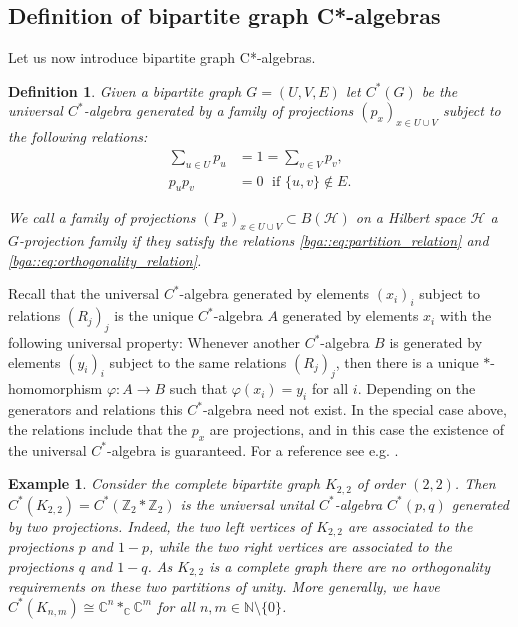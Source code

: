 \documentclass[a4paper]{amsart}
\newtheorem{definition}[thm]{Definition}
\newtheorem{example}[thm]{Example}
\newcommand{\C}{\mathbb{C}}
\newcommand{\N}{\mathbb{N}}
\newcommand{\Z}{\mathbb{Z}}
\begin{document}
\subsection{Definition of bipartite graph C*-algebras}

Let us now introduce bipartite graph C*-algebras.

\begin{definition} 
    \label{bipartite_graph_algebras:definition}
    Given a bipartite graph $G = (U, V, E)$ let $C^\ast(G)$ be the universal $C^\ast$-algebra generated by a family of projections $(p_x)_{x \in U \cup V}$ subject to the following relations:
    \begin{align}
        \sum_{u \in U} p_u &= 1 = \sum_{v \in V} p_v,        \tag{GP1} \label{bga::eq:partition_relation} \\
        p_u p_v &= 0 \; \text{ if } \{u, v\} \not \in E.     \tag{GP2} \label{bga::eq:orthogonality_relation}
    \end{align}
    
    We call a family of projections $(P_x)_{x \in U \cup V} \subset B(\mathcal{H})$ on a Hilbert space $\mathcal{H}$ a $G$-projection family if they satisfy the relations \eqref{bga::eq:partition_relation} and \eqref{bga::eq:orthogonality_relation}.
\end{definition}

Recall that the universal $C^\ast$-algebra generated by elements $(x_i)_i$ subject to relations $(R_j)_j$ is the unique $C^\ast$-algebra $A$ generated by elements $x_i$ with the following universal property: Whenever another $C^\ast$-algebra $B$ is generated by elements $(y_i)_i$ subject to the same relations $(R_j)_j$, then there is a unique $\ast$-homomorphism $\varphi: A \to B$ such that $\varphi(x_i) = y_i$ for all $i$. Depending on the generators and relations this $C^\ast$-algebra need not exist. In the special case above, the relations include that the $p_x$ are projections, and in this case the existence of the universal $C^\ast$-algebra is guaranteed. For a reference see e.g. \cite[Section II.8.3]{blackadar_operator_2006}.

\begin{example}
    \label{bga::example:C_nm_as_bipartite_graph_algebra}
    Consider the complete bipartite graph $K_{2,2}$ of order $(2,2)$. Then $C^\ast(K_{2,2}) = C^\ast(\Z_2 \ast \Z_2)$ is the universal unital $C^\ast$-algebra $C^\ast(p,q)$ generated by two projections. Indeed, the two left vertices of $K_{2,2}$ are associated to the projections $p$ and $1-p$, while the two right vertices are associated to the projections $q$ and $1-q$. As $K_{2,2}$ is a complete graph there are no orthogonality requirements on these two partitions of unity. More generally, we have $C^\ast(K_{n,m}) \cong \C^n *_\C \C^m$ for all $n,m \in \N \setminus \{0\}$.
\end{example}
\end{document}
